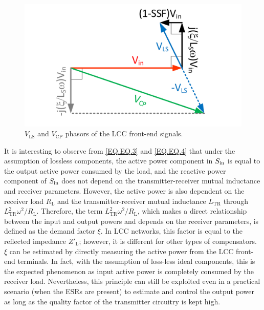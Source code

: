 \documentclass[journal,a4paper]{IEEEtran}
\begin{document}
\begin{figure}[t!]
\begin{center}
	\includegraphics[clip, trim=0cm 0cm 0cm 0cm, width=.65\columnwidth]{Figs/Fig5.pdf}
\end{center}
\vspace{-0.2cm}
	\caption{$V_\textrm{LS}$ and $V_\textrm{CP}$ phasors of the LCC front-end signals.}
		\label{Fig.Fig5}
		\vspace{-3mm}
\end{figure}
It is interesting to observe from  \eqref{EQ.EQ.3} and \eqref{EQ.EQ.4} that under the assumption of lossless components, the active power component in $S_{\rm in}$ is equal to the output active power consumed by the load, and the reactive power component of $S_{\rm in}$ does not depend on the transmitter-receiver mutual inductance and receiver parameters. However, the active power is also dependent on the receiver load $R_\mathrm{L}$ and the transmitter-receiver mutual inductance $L_\textrm{TR}$ through ${L_{\textrm{TR}}^2\omega^2}/{R_\textrm{L}}$. Therefore, the term ${L_{\textrm{TR}}^2\omega^2}/{R_\textrm{L}}$, which makes a direct relationship between the input and output powers and depends on the receiver parameters, is defined as the demand factor $\xi$. In LCC networks, this factor is equal to the reflected impedance $Z'_{\mathrm{L}}$; however, it is different for other types of compensators. $\xi$ can be estimated by directly measuring the active power from the LCC front-end terminals. In fact, with the assumption of loss-less ideal components, this is the expected phenomenon as input active power is completely consumed by the receiver load. Nevertheless, this principle can still be exploited even in a practical scenario (when the ESRs are present) to estimate and control the output power as long as the quality factor of the transmitter circuitry is kept high.
\end{document}
